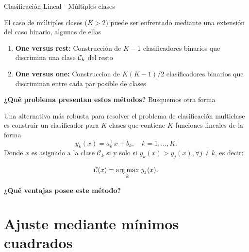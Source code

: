 \documentclass[9pt]{beamer}
\begin{document}
\begin{frame}{Clasificación Lineal - Múltiples clases}

El caso de múltiples clases ($K>2$) puede ser enfrentado mediante una extensión del caso binario, algunas de ellas 

\begin{enumerate}

  \item \textbf{One versus rest: } Construcción de $K-1$ clasificadores binarios que discrimina una clase ${\mathcal C}_k$ del resto \pause


  \item \textbf{One versus one: } Construccion de $K(K-1)/2$ clasificadores binarios que discriminan entre cada par posible de clases \pause

\end{enumerate}

\textbf{¿Qué problema presentan estos métodos?} \pause Busquemos otra forma \pause 

\vspace{0.5cm}

Una alternativa más robusta para resolver el problema de clasificación multiclase es construir un clasificador para $K$ clases que contiene $K$ funciones lineales de la forma 
\begin{equation*}
  y_k(x) = a_k^\top x + b_k, \quad k=1,\ldots,K.
\end{equation*}
\pause 
Donde $x$ es asignado a la clase $\mathcal{C}_k$ si y solo si $y_k(x) > y_j(x), \forall j\neq k$, es decir: 

\begin{equation*}
  \mathcal{C}(x) = \underset{k}{\operatorname*{arg\,max}}\hspace{1mm} y_j(x).
\end{equation*}

\pause 
\textbf{¿Qué ventajas posee este método?}

\end{frame}

\section{Ajuste mediante mínimos cuadrados}
\end{document}
